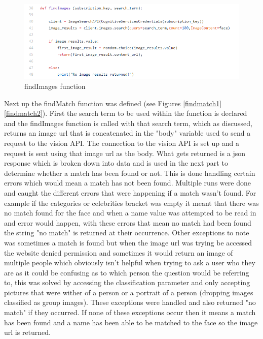 \documentclass[12pt,a4paper]{article}
\begin{document}
\begin{figure}[!ht]
    \centering
    \includegraphics[width=1.0\textwidth]{Figs/findimages.PNG} 
    \caption{findImages function} 
    \label{findimages}
\end{figure}  

Next up the findMatch function was defined (see Figures \ref{findmatch1} \ref{findmatch2}). First the search term to be used within the function is declared and the findImages function is called with that search term, which as discussed, returns an image url that is concatenated in the "body" variable used to send a request to the vision API. The connection to the vision API is set up and a request is sent using that image url as the body. What gets returned is a json response which is broken down into data and is used in the next part to determine whether a match has been found or not. This is done handling certain errors which would mean a match has not been found. Multiple runs were done and caught the different errors that were happening if a match wasn't found. For example if the categories or celebrities bracket was empty it meant that there was no match found for the face and when a name value was attempted to be read in and error would happen, with these errors that mean no match had been found the string "no match" is returned at their occurrence. Other exceptions to note was sometimes a match is found but when the image url was trying be accessed the website denied permission and sometimes it would return an image of multiple people which obviously isn't helpful when trying to ask a user who they are as it could be confusing as to which person the question would be referring to, this was solved by accessing the classification parameter and only accepting pictures that were wither of a person or a portrait of a person (dropping images classified as group images). These exceptions were handled and also returned "no match" if they occurred. If none of these exceptions occur then it means a match has been found and a name has been able to be matched to the face so the image url is returned.
\end{document}
